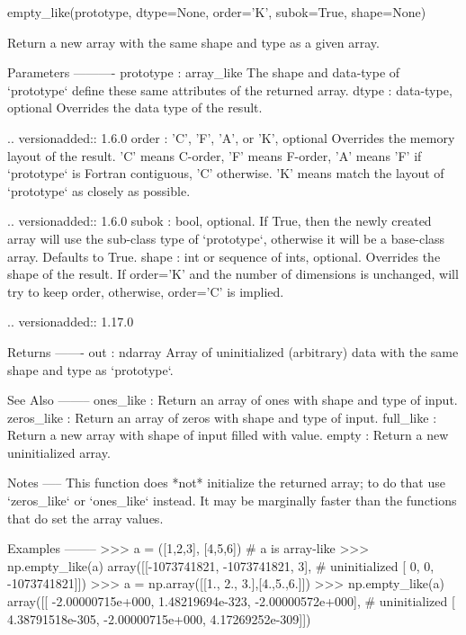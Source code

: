 \begin{DoxyVerb}empty_like(prototype, dtype=None, order='K', subok=True, shape=None)

Return a new array with the same shape and type as a given array.

Parameters
----------
prototype : array_like
    The shape and data-type of `prototype` define these same attributes
    of the returned array.
dtype : data-type, optional
    Overrides the data type of the result.

    .. versionadded:: 1.6.0
order : {'C', 'F', 'A', or 'K'}, optional
    Overrides the memory layout of the result. 'C' means C-order,
    'F' means F-order, 'A' means 'F' if `prototype` is Fortran
    contiguous, 'C' otherwise. 'K' means match the layout of `prototype`
    as closely as possible.

    .. versionadded:: 1.6.0
subok : bool, optional.
    If True, then the newly created array will use the sub-class
    type of `prototype`, otherwise it will be a base-class array. Defaults
    to True.
shape : int or sequence of ints, optional.
    Overrides the shape of the result. If order='K' and the number of
    dimensions is unchanged, will try to keep order, otherwise,
    order='C' is implied.

    .. versionadded:: 1.17.0

Returns
-------
out : ndarray
    Array of uninitialized (arbitrary) data with the same
    shape and type as `prototype`.

See Also
--------
ones_like : Return an array of ones with shape and type of input.
zeros_like : Return an array of zeros with shape and type of input.
full_like : Return a new array with shape of input filled with value.
empty : Return a new uninitialized array.

Notes
-----
This function does *not* initialize the returned array; to do that use
`zeros_like` or `ones_like` instead.  It may be marginally faster than
the functions that do set the array values.

Examples
--------
>>> a = ([1,2,3], [4,5,6])                         # a is array-like
>>> np.empty_like(a)
array([[-1073741821, -1073741821,           3],    # uninitialized
       [          0,           0, -1073741821]])
>>> a = np.array([[1., 2., 3.],[4.,5.,6.]])
>>> np.empty_like(a)
array([[ -2.00000715e+000,   1.48219694e-323,  -2.00000572e+000], # uninitialized
       [  4.38791518e-305,  -2.00000715e+000,   4.17269252e-309]])\end{DoxyVerb}
 \mbox{\label{namespacenumpy_1_1core_1_1multiarray_a87e95f0f4d5d73db08caf30ba5207e24}} 

